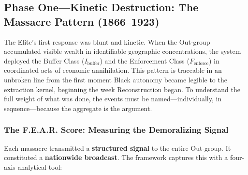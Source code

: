 \subsection{Phase One---Kinetic Destruction: The Massacre Pattern (1866--1923)}

The Elite's first response was blunt and kinetic. When the Out-group accumulated visible wealth in identifiable geographic concentrations, the system deployed the Buffer Class ($I_{\text{buffer}}$) and the Enforcement Class ($F_{\text{enforce}}$) in coordinated acts of economic annihilation. This pattern is traceable in an unbroken line from the first moment Black autonomy became legible to the extraction kernel, beginning the week Reconstruction began. To understand the full weight of what was done, the events must be named---individually, in sequence---because the aggregate is the argument.

\subsubsection{The F.E.A.R. Score: Measuring the Demoralizing Signal}
\label{sec:fear_score}

Each massacre transmitted a \textbf{structured signal} to the entire Out-group. It constituted a \textbf{nationwide broadcast}. The framework captures this with a four-axis analytical tool:


